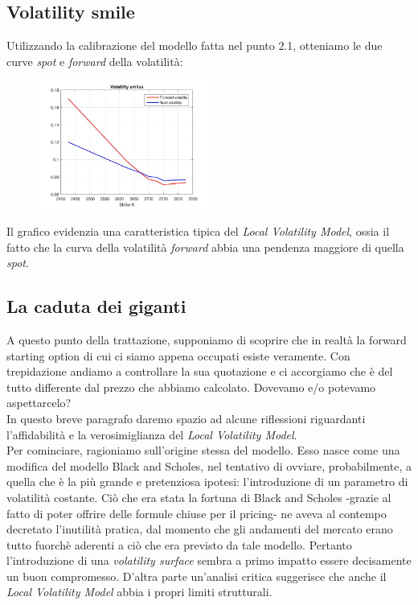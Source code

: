 \documentclass[11pt]{article}
\begin{document}
\subsection{Volatility smile}
Utilizzando la calibrazione del modello fatta nel punto 2.1, otteniamo le due curve \textit{spot} e \textit{forward} della volatilità:

\begin{figure}[H]
\centering
\includegraphics[width=0.5\textwidth]{vol_smile}
\end{figure}

Il grafico evidenzia una caratteristica tipica del \textit{Local Volatility Model}, ossia il fatto che la curva della volatilità \textit{forward} abbia una pendenza maggiore di quella  \textit{spot}.

\subsection{La caduta dei giganti}

A questo punto della trattazione, supponiamo di scoprire che in realtà la forward starting option di cui ci siamo appena occupati esiste veramente. Con trepidazione andiamo a controllare la sua quotazione e ci accorgiamo che è del tutto differente dal prezzo che abbiamo calcolato. Dovevamo e/o potevamo aspettarcelo?\\

In questo breve paragrafo daremo spazio ad alcune riflessioni riguardanti l'affidabilità e la verosimiglianza del \textit{Local Volatility Model}.\\

Per cominciare, ragioniamo sull'origine stessa del modello. Esso nasce come una modifica del modello Black and Scholes, nel tentativo di ovviare, probabilmente, a quella che è la più grande e pretenziosa ipotesi: l'introduzione di un parametro di volatilità costante. Ciò che era stata la fortuna di Black and Scholes -grazie al fatto di poter offrire delle formule chiuse per il pricing- ne aveva al contempo decretato l'inutilità pratica, dal momento che gli andamenti del mercato erano tutto fuorchè aderenti a ciò che era previsto da tale modello. Pertanto l'introduzione di una \textit{volatility surface} sembra a primo impatto essere decisamente un buon compromesso. D'altra parte un'analisi critica suggerisce che anche il \textit{Local Volatility Model} abbia i propri limiti strutturali.\\
\end{document}
